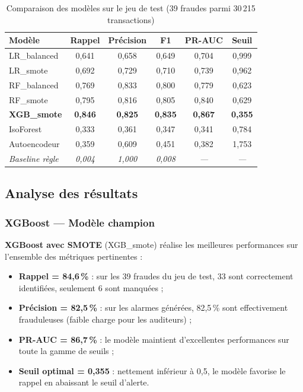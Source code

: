 \documentclass[12pt,a4paper,twoside]{report}
\theoremstyle{definition}
\begin{document}
\begin{table}[H]
\centering
\caption{Comparaison des modèles sur le jeu de test (39 fraudes parmi 30\,215 transactions)}
\label{tab:model_comparison}
\renewcommand{\arraystretch}{1.4}
\begin{tabular}{lccccc}
\toprule
\textbf{Modèle} & \textbf{Rappel} & \textbf{Précision} & \textbf{F1} & \textbf{PR-AUC} & \textbf{Seuil} \\
\midrule
LR\_balanced      & 0,641 & 0,658 & 0,649 & 0,704 & 0,999 \\
LR\_smote         & 0,692 & 0,729 & 0,710 & 0,739 & 0,962 \\
RF\_balanced      & 0,769 & 0,833 & 0,800 & 0,779 & 0,623 \\
RF\_smote         & 0,795 & 0,816 & 0,805 & 0,840 & 0,629 \\
\rowcolor{pwcorange!25}
\textbf{XGB\_smote} & \textbf{0,846} & \textbf{0,825} & \textbf{0,835} & \textbf{0,867} & \textbf{0,355} \\
IsoForest         & 0,333 & 0,361 & 0,347 & 0,341 & 0,784 \\
Autoencodeur      & 0,359 & 0,609 & 0,451 & 0,382 & 1,753 \\
\midrule
\textit{Baseline règle} & \textit{0,004} & \textit{1,000} & \textit{0,008} & \textit{—} & \textit{—} \\
\bottomrule
\end{tabular}
\end{table}

\subsection{Analyse des résultats}

\subsubsection{XGBoost — Modèle champion}

\textbf{XGBoost avec SMOTE} (XGB\_smote) réalise les meilleures performances sur
l'ensemble des métriques pertinentes :
\begin{itemize}
  \item \textbf{Rappel = 84,6\,\%} : sur les 39 fraudes du jeu de test, 33 sont
    correctement identifiées, seulement 6 sont manquées ;
  \item \textbf{Précision = 82,5\,\%} : sur les alarmes générées, 82,5\,\% sont
    effectivement frauduleuses (faible charge pour les auditeurs) ;
  \item \textbf{PR-AUC = 86,7\,\%} : le modèle maintient d'excellentes performances
    sur toute la gamme de seuils ;
  \item \textbf{Seuil optimal = 0,355} : nettement inférieur à 0,5, le modèle
    favorise le rappel en abaissant le seuil d'alerte.
\end{itemize}
\end{document}
